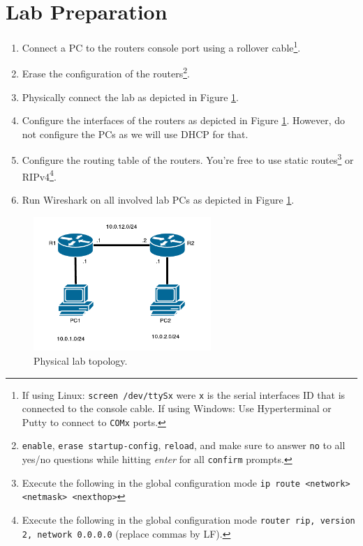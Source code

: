 \documentclass[pdftex,12pt,a4paper]{article}
\begin{document}
    \section{Lab Preparation}
        \begin{enumerate}
            \item Connect a PC to the routers console port using a rollover
                cable\footnote{If using Linux: \texttt{screen /dev/ttySx} were
                \texttt{x} is the
                serial interfaces ID that is connected to the console
                cable. If using Windows: Use Hyperterminal or Putty to
                connect to \texttt{COMx} ports.}.
            \item Erase the configuration of the
                routers\footnote{\texttt{enable}, \texttt{erase
                startup-config}, \texttt{reload}, and make sure to answer
                \texttt{no} to all yes/no questions while hitting
                \emph{enter} for all \texttt{confirm} prompts.}.
            \item Physically connect the lab as depicted in Figure \ref{fig:labtop}.
            \item Configure the interfaces of the routers as depicted in Figure
                \ref{fig:labtop}. However, do not configure the PCs as we will
                use DHCP for that.
            \item Configure the routing table of the routers. You're free to
                use static routes\footnote{Execute the following in the global
                    configuration mode \texttt{ip route <network> <netmask>
                <nexthop>}} or RIPv4\footnote{Execute the following in the
                    global configuration mode \texttt{router rip, version 2, network
                0.0.0.0} (replace commas by LF).}.
            \item Run Wireshark on all involved lab PCs as depicted in Figure
                \ref{fig:labtop}.
        \end{enumerate}

        \begin{figure}[tbh]
            \centering
            \includegraphics[width=0.6\textwidth]{figures/misc}
            \caption{Physical lab topology.}
            \label{fig:labtop}
        \end{figure}
\end{document}
